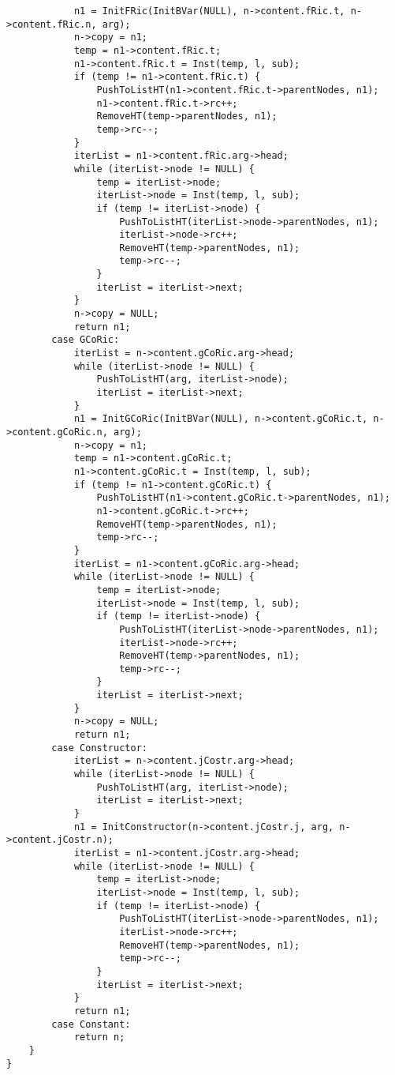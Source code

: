 \documentclass[12pt,a4paper,openright,twoside]{report}
\begin{document}
\begin{verbatim}
            n1 = InitFRic(InitBVar(NULL), n->content.fRic.t, n->content.fRic.n, arg);
            n->copy = n1;
            temp = n1->content.fRic.t;
            n1->content.fRic.t = Inst(temp, l, sub);
            if (temp != n1->content.fRic.t) {
                PushToListHT(n1->content.fRic.t->parentNodes, n1);
                n1->content.fRic.t->rc++;
                RemoveHT(temp->parentNodes, n1);
                temp->rc--;
            }
            iterList = n1->content.fRic.arg->head;
            while (iterList->node != NULL) {
                temp = iterList->node;
                iterList->node = Inst(temp, l, sub);
                if (temp != iterList->node) {
                    PushToListHT(iterList->node->parentNodes, n1);
                    iterList->node->rc++;
                    RemoveHT(temp->parentNodes, n1);
                    temp->rc--;
                }
                iterList = iterList->next;
            }
            n->copy = NULL;
            return n1;
        case GCoRic:
            iterList = n->content.gCoRic.arg->head;
            while (iterList->node != NULL) {
                PushToListHT(arg, iterList->node);
                iterList = iterList->next;
            }
            n1 = InitGCoRic(InitBVar(NULL), n->content.gCoRic.t, n->content.gCoRic.n, arg);
            n->copy = n1;
            temp = n1->content.gCoRic.t;
            n1->content.gCoRic.t = Inst(temp, l, sub);
            if (temp != n1->content.gCoRic.t) {
                PushToListHT(n1->content.gCoRic.t->parentNodes, n1);
                n1->content.gCoRic.t->rc++;
                RemoveHT(temp->parentNodes, n1);
                temp->rc--;
            }
            iterList = n1->content.gCoRic.arg->head;
            while (iterList->node != NULL) {
                temp = iterList->node;
                iterList->node = Inst(temp, l, sub);
                if (temp != iterList->node) {
                    PushToListHT(iterList->node->parentNodes, n1);
                    iterList->node->rc++;
                    RemoveHT(temp->parentNodes, n1);
                    temp->rc--;
                }
                iterList = iterList->next;
            }
            n->copy = NULL;
            return n1;
        case Constructor:
            iterList = n->content.jCostr.arg->head;
            while (iterList->node != NULL) {
                PushToListHT(arg, iterList->node);
                iterList = iterList->next;
            }
            n1 = InitConstructor(n->content.jCostr.j, arg, n->content.jCostr.n);
            iterList = n1->content.jCostr.arg->head;
            while (iterList->node != NULL) {
                temp = iterList->node;
                iterList->node = Inst(temp, l, sub);
                if (temp != iterList->node) {
                    PushToListHT(iterList->node->parentNodes, n1);
                    iterList->node->rc++;
                    RemoveHT(temp->parentNodes, n1);
                    temp->rc--;
                }
                iterList = iterList->next;
            }
            return n1;
        case Constant:
            return n;
    }
}

\end{verbatim}
\end{document}
